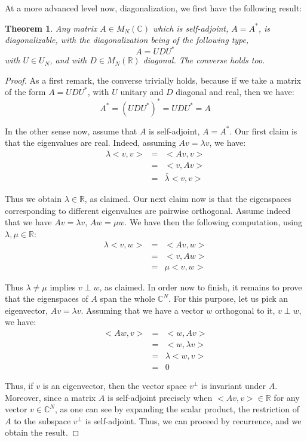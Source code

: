 \documentclass[12pt]{amsbook}
\newtheorem{theorem}{Theorem}[chapter]
\begin{document}
At a more advanced level now, diagonalization, we first have the following result:

\begin{theorem}
Any matrix $A\in M_N(\mathbb C)$ which is self-adjoint, $A=A^*$, is diagonalizable, with the diagonalization being of the following type,
$$A=UDU^*$$
with $U\in U_N$, and with $D\in M_N(\mathbb R)$ diagonal. The converse holds too.
\end{theorem}

\begin{proof}
As a first remark, the converse trivially holds, because if we take a matrix of the form $A=UDU^*$, with $U$ unitary and $D$ diagonal and real, then we have:
$$A^*
=(UDU^*)^*
=UDU^*
=A$$

In the other sense now, assume that $A$ is self-adjoint, $A=A^*$.  Our first claim is that the eigenvalues are real. Indeed, assuming $Av=\lambda v$, we have:
\begin{eqnarray*}
\lambda<v,v>
&=&<Av,v>\\
&=&<v,Av>\\
&=&\bar{\lambda}<v,v>
\end{eqnarray*}

Thus we obtain $\lambda\in\mathbb R$, as claimed. Our next claim now is that the eigenspaces corresponding to different eigenvalues are pairwise orthogonal. Assume indeed that we have $Av=\lambda v$, $Aw=\mu w$. We have then the following computation, using $\lambda,\mu\in\mathbb R$:
\begin{eqnarray*}
\lambda<v,w>
&=&<Av,w>\\
&=&<v,Aw>\\
&=&\mu<v,w>
\end{eqnarray*}

Thus $\lambda\neq\mu$ implies $v\perp w$, as claimed. In order now to finish, it remains to prove that the eigenspaces of $A$ span the whole $\mathbb C^N$. For this purpose, let us pick an eigenvector, $Av=\lambda v$. Assuming that we have a vector $w$ orthogonal to it, $v\perp w$, we have:
\begin{eqnarray*}
<Aw,v>
&=&<w,Av>\\
&=&<w,\lambda v>\\
&=&\lambda<w,v>\\
&=&0
\end{eqnarray*}

Thus, if $v$ is an eigenvector, then the vector space $v^\perp$ is invariant under $A$. Moreover, since a matrix $A$ is self-adjoint precisely when $<Av,v>\in\mathbb R$ for any vector $v\in\mathbb C^N$, as one can see by expanding the scalar product, the restriction of $A$ to the subspace $v^\perp$ is self-adjoint. Thus, we can proceed by recurrence, and we obtain the result.
\end{proof}
\end{document}
